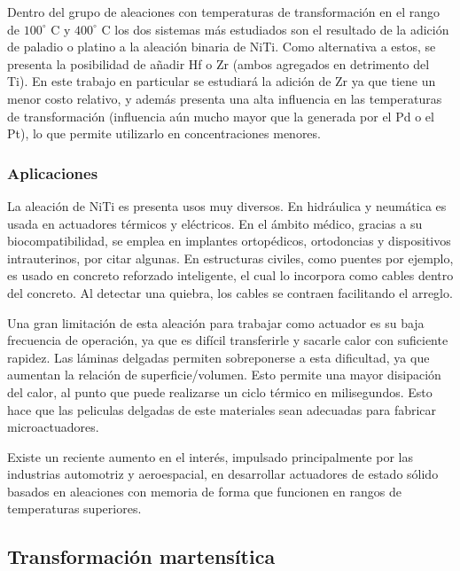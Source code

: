 \documentclass{article}
\theoremstyle{definition}
\theoremstyle{remark}
\begin{document}
Dentro del grupo de aleaciones con temperaturas de transformación en el rango de $100^\circ$ C y $400^\circ$ C los dos sistemas más estudiados son el resultado de la adición de paladio o platino a la aleación binaria de NiTi. Como alternativa a estos, se presenta la posibilidad de añadir Hf o Zr (ambos agregados en detrimento del Ti)\cite{HTSMA}. En este trabajo en particular se estudiará la adición de Zr ya que tiene un menor costo relativo, y además presenta una alta influencia en las temperaturas de transformación (influencia aún mucho mayor que la generada por el Pd o el Pt), lo que permite utilizarlo en concentraciones menores\citep{HTSMA}.

\subsubsection{Aplicaciones}
La aleación de NiTi es presenta usos muy diversos. En hidráulica y neumática es usada en actuadores térmicos y eléctricos. En el ámbito médico, gracias a su biocompatibilidad, se emplea en implantes ortopédicos, ortodoncias y dispositivos intrauterinos, por citar algunas. En estructuras civiles, como puentes por ejemplo, es usado en concreto reforzado inteligente, el cual lo incorpora como cables dentro del concreto. Al detectar una quiebra, los cables se contraen facilitando el arreglo\cite{Engineering}.

Una gran limitación de esta aleación para trabajar como actuador es su baja frecuencia de operación, ya que es difícil transferirle y sacarle calor con suficiente rapidez. Las láminas delgadas permiten sobreponerse a esta dificultad, ya que aumentan la relación de superficie/volumen. Esto permite una mayor disipación del calor, al punto que puede realizarse un ciclo térmico en milisegundos. Esto hace que las peliculas delgadas de este materiales sean adecuadas para fabricar microactuadores\citep{ThinFilm}.

Existe un reciente aumento en el interés, impulsado principalmente por las industrias automotriz y aeroespacial, en desarrollar actuadores de estado sólido basados en aleaciones con memoria de forma que funcionen en rangos de temperaturas superiores.
\subsection{Transformación martensítica}
\end{document}
